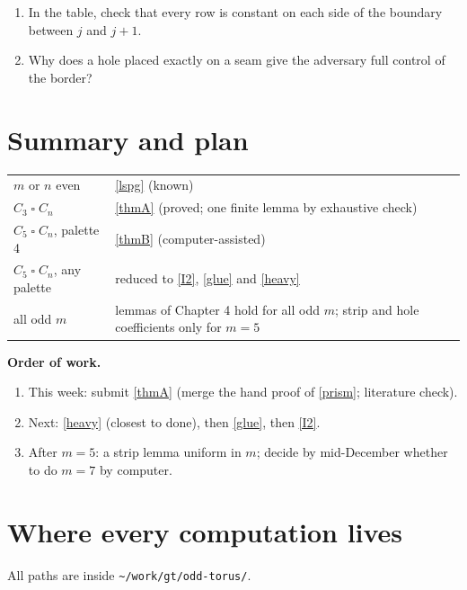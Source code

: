 \documentclass[11pt,oneside,openany]{book}
\newenvironment{ponder}{\begin{tcolorbox}[breakable,colback=yellow!7,colframe=orange!70!black,fonttitle=\bfseries,title={Think it over}]\begin{enumerate}[label=\textbf{Q\arabic*.},leftmargin=2.4em,itemsep=0.25em]}{\end{enumerate}\end{tcolorbox}}
\newcommand{\T}{\mathbin{\square}}
\begin{document}
\begin{ponder}
\item In the table, check that every row is constant on each side of the boundary between $j$ and $j+1$.
\item Why does a hole placed exactly on a seam give the adversary full control of the border?
\end{ponder}

\chapter{Summary and plan}

\begin{center}
\renewcommand{\arraystretch}{1.3}
\begin{tabular}{p{4.2cm}p{9.5cm}}
\toprule
$m$ or $n$ even & \ref{lspg} (known)\\
$C_3 \T C_n$ & \ref{thmA} (proved; one finite lemma by exhaustive check)\\
$C_5 \T C_n$, palette 4 & \ref{thmB} (computer-assisted)\\
$C_5 \T C_n$, any palette & reduced to \ref{I2}, \ref{glue} and \ref{heavy}\\
all odd $m$ & lemmas of Chapter 4 hold for all odd $m$; strip and hole coefficients only for $m = 5$\\
\bottomrule
\end{tabular}
\end{center}

\textbf{Order of work.}
\begin{enumerate}[nosep]
\item This week: submit \ref{thmA} (merge the hand proof of \ref{prism}; literature check).
\item Next: \ref{heavy} (closest to done), then \ref{glue}, then \ref{I2}.
\item After $m = 5$: a strip lemma uniform in $m$; decide by mid-December whether to do $m = 7$ by computer.
\end{enumerate}

\appendix
\chapter{Where every computation lives}\label{app:scripts}

All paths are inside \texttt{\textasciitilde/work/gt/odd-torus/}.
\end{document}
